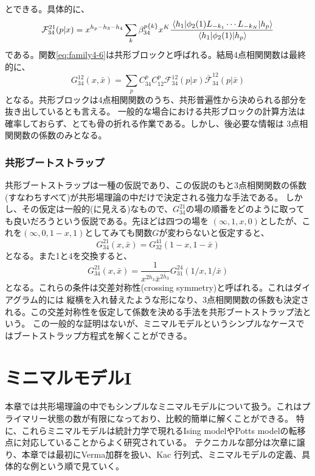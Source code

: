 \documentclass[11pt, aps, longbibliography]{article}
\numberwithin{equation}{section}
\begin{document}
        とできる。具体的に、
        \begin{equation}\label{eq:family4-6}
            \mathcal{F}_{34}^{21}(p|x) = x^{h_p-h_3-h_4}\sum_k \beta_{34}^{p\left\{ k \right\}}x^K \frac{\matrixel{h_1}{\phi_2(1)L_{-k_1}\cdots L_{-k_N}}{h_p}}{\matrixel{h_1}{\phi_2(1)}{h_p}}
        \end{equation}
        である。関数\eqref{eq:family4-6}は共形ブロックと呼ばれる。結局4点相関関数は最終的に、
        \begin{equation}\label{eq:family4-7}
            G_{34}^{12}(x,\bar{x}) = \sum_p C_{34}^pC_{12}^p \mathcal{F}_{34}^{12}(p|x)\bar{\mathcal{F}}_{34}^{12}(p|\bar{x})
        \end{equation}
        となる。共形ブロックは4点相関関数のうち、共形普遍性から決められる部分を抜き出しているとも言える。
        一般的な場合における共形ブロックの計算方法は確率しておらず、とても骨の折れる作業である。しかし、後必要な情報は
        3点相関関数の係数のみとなる。

        \subsubsection{共形ブートストラップ}
        共形ブートストラップは一種の仮説であり、この仮説のもと3点相関関数の係数(すなわちすべて)が共形場理論の中だけで決定される強力な手法である。
        しかし、その仮定は一般的(に見える)なもので、$G_{34}^{21}$の場の順番をどのように取っても良いだろうという仮説である。先ほどは四つの場を
        $(\infty,1,x,0)$としたが、これを$(\infty, 0, 1-x, 1)$としてみても関数$G$が変わらないと仮定すると、
        \begin{equation}\label{eq:family5-1}
            G_{34}^{21}(x,\bar{x}) = G_{32}^{41}(1-x,1-\bar{x})
        \end{equation}
        となる。また1と4を交換すると、
        \begin{equation}\label{eq:family5-2}
            G_{34}^{21}(x,\bar{x}) = \frac{1}{x^{2h_3}\bar{x}^{2\bar{h}_3}}G_{31}^{24}(1/x,1/\bar{x})
        \end{equation}
        となる。これらの条件は交差対称性(crossing symmetry)と呼ばれる。これはダイアグラム的には
        縦横を入れ替えたような形になり、3点相関関数の係数も決定される。この交差対称性を仮定して係数を決める手法を共形ブートストラップ法という。
        この一般的な証明はないが、ミニマルモデルというシンプルなケースではブートストラップ方程式を解くことができる。

    \section{ミニマルモデルI}
    本章では共形場理論の中でもシンプルなミニマルモデルについて扱う。これはプライマリー状態の数が有限になっており、比較的簡単に解くことができる。
    特に、これらミニマルモデルは統計力学で現れるIsing modelやPotts modelの転移点に対応していることからよく研究されている。
    テクニカルな部分は次章に譲り、本章では最初にVerma加群を扱い、Kac 行列式、ミニマルモデルの定義、具体的な例という順で見ていく。
\end{document}
